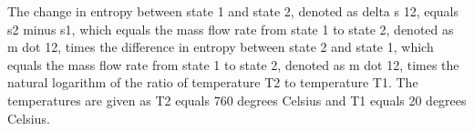 The change in entropy between state 1 and state 2, denoted as delta s 12, equals s2 minus s1, which equals the mass flow rate from state 1 to state 2, denoted as m dot 12, times the difference in entropy between state 2 and state 1, which equals the mass flow rate from state 1 to state 2, denoted as m dot 12, times the natural logarithm of the ratio of temperature T2 to temperature T1. The temperatures are given as T2 equals 760 degrees Celsius and T1 equals 20 degrees Celsius.